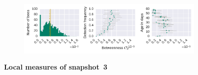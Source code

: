 \begin{figure}[!h]
\begin{subfigure}[b]{1.0\textwidth}
	\end{subfigure}
	\begin{subfigure}[b]{1.0\textwidth}
	\centering
	\includegraphics[width=1.0\textwidth]{Figures/n3-stat-betweenAgeDetF.pdf}
	\end{subfigure}
	\caption[Local measures of snapshot~3]{\textbf{Local measures of snapshot~3}}
	\label{fig:n3-degreeStrLCC}
\end{figure}